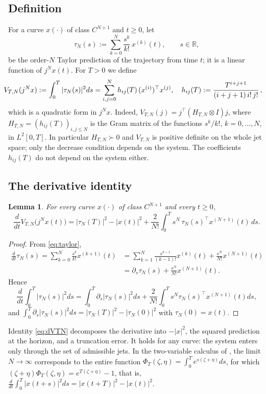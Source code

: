 \documentclass[preprint,12pt,authoryear]{elsarticle}
\newtheorem{lemma}[theorem]{Lemma}
\theoremstyle{definition}
\theoremstyle{remark}
\newcommand{\R}{\mathbb{R}}
\newcommand{\tr}{^{\top}}
\begin{document}
\subsection{Definition}
For a curve $x(\cdot)$ of class $C^{N+1}$ and $t\ge0$, let
\begin{equation}\label{eq:taylor}
\tau_N(s):=\sum_{k=0}^N\frac{s^k}{k!}\,x^{(k)}(t),\qquad s\in\R,
\end{equation}
be the order-$N$ Taylor prediction of the trajectory from time $t$; it is a linear function of $j^Nx(t)$. For $T>0$ we define
\begin{equation}\label{eq:VTN}\hspace*{-1em}
V_{T,N}(j^Nx):=\int_0^T|\tau_N(s)|^2ds=\sum_{i,j=0}^Nh_{ij}(T)\,(x^{(i)})\tr x^{(j)},\quad h_{ij}(T):=\frac{T^{i+j+1}}{(i+j+1)\,i!\,j!}\,,
\end{equation}
which is a quadratic form in $j^Nx$.
Indeed, $V_{T,N}(j)=j\tr(H_{T,N}\otimes I)j$, where $H_{T,N}=(h_{ij}(T))_{i,j\le N}$ is the Gram matrix of the functions $s^k/k!$, $k=0,\dots,N$, in $L^2[0,T]$. In particular $H_{T,N}\succ0$ and $V_{T,N}$ is positive definite on the whole jet space; only the decrease condition depends on the system. The coefficients $h_{ij}(T)$ do not depend on the system either.

\subsection{The derivative identity}
\begin{lemma}\label{lem:dV}
For every curve $x(\cdot)$ of class $C^{N+1}$ and every $t\ge0$,
\begin{equation}\label{eq:dVTN}
\frac{d}{dt}V_{T,N}\big(j^Nx(t)\big)=|\tau_N(T)|^2-|x(t)|^2+\frac{2}{N!}\int_0^Ts^N\,\tau_N(s)\tr x^{(N+1)}(t)\,ds .
\end{equation}
\end{lemma}
\begin{proof}
From \eqref{eq:taylor},
\begin{align}\label{eq:dtau}
\frac{d}{dt}\tau_N(s)=\sum_{k=0}^N\frac{s^k}{k!}x^{(k+1)}(t)&=\sum_{k=1}^{N}\frac{s^{k-1}}{(k-1)!}x^{(k)}(t)+\frac{s^N}{N!}x^{(N+1)}(t)\nonumber\\
&=\partial_s\tau_N(s)+\frac{s^N}{N!}x^{(N+1)}(t).
\end{align}
Hence
\begin{equation}
\frac{d}{dt}\int_0^T|\tau_N(s)|^2ds=\int_0^T\partial_s|\tau_N(s)|^2ds+\frac{2}{N!}\int_0^Ts^N\tau_N(s)\tr x^{(N+1)}(t)ds ,
\end{equation}
and $\int_0^T\partial_s|\tau_N(s)|^2ds=|\tau_N(T)|^2-|\tau_N(0)|^2$ with $\tau_N(0)=x(t)$.
\end{proof}
Identity \eqref{eq:dVTN} decomposes the derivative into $-|x|^2$, the squared prediction at the horizon, and a truncation error. It holds for any curve: the system enters only through the set of admissible jets. In the two-variable calculus of \citet{WillemsTrentelman1998}, the limit $N\to\infty$ corresponds to the entire function $\Phi_T(\zeta,\eta)=\int_0^Te^{s(\zeta+\eta)}ds$, for which $(\zeta+\eta)\Phi_T(\zeta,\eta)=e^{T(\zeta+\eta)}-1$, that is, $\frac{d}{dt}\int_0^T|x(t+s)|^2ds=|x(t+T)|^2-|x(t)|^2$.
\end{document}
